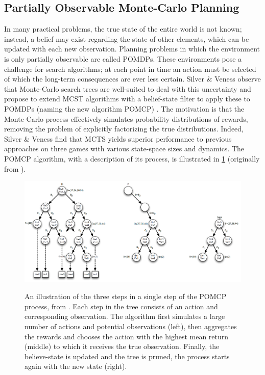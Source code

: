 \subsection{Partially Observable Monte-Carlo Planning}
In many practical problems, the true state of the entire world is not known; instead, a belief may exist regarding the state of other elements, which can be updated with each new observation. Planning problems in which the environment is only partially observable are called POMDPs. These environments pose a challenge for search algorithms; at each point in time an action must be selected of which the long-term consequences are ever less certain. Silver \& Veness observe that Monte-Carlo search trees are well-suited to deal with this uncertainty and propose to extend MCST algorithms with a belief-state filter to apply these to POMDPs (naming the new algorithm POMCP) \cite{silver2010monte}. The motivation is that the Monte-Carlo process effectively simulates probability distributions of rewards, removing the problem of explicitly factorizing the true distributions. Indeed, Silver \& Veness find that MCTS yields superior performance to previous approaches on three games with various state-space sizes and dynamics. The POMCP algorithm, with a description of its process, is illustrated in \ref{fig:pomcp} (originally from \cite{silver2010monte}). 

\begin{figure}[ht!]
\includegraphics[width=\linewidth]{pomdp.png}
\label{fig:pomcp}
\caption{An illustration of the three steps in a single step of the POMCP process, from \cite{silver2010monte}. Each step in the tree consists of an action and corresponding observation. The algorithm first simulates a large number of actions and potential observations (left), then aggregates the rewards and chooses the action with the highest mean return (middle) to which it receives the true observation. Finally, the believe-state is updated and the tree is pruned, the process starts again with the new state (right).}
\end{figure}
